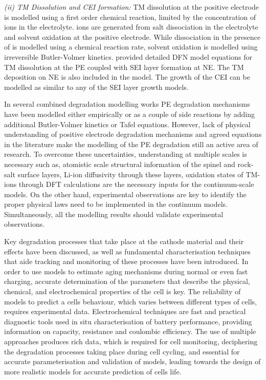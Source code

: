 \documentclass[journal=jacsat,manuscript=article]{achemso}
\begin{document}
\textit{(ii) TM Dissolution and CEI formation:} TM dissolution at the positive electrode is modelled using a first order chemical reaction, limited by the concentration of  ions in the electrolyte. \cite{dai2012capacity}  ions are generated from  salt dissociation in the electrolyte and solvent oxidation at the positive electrode. While  dissociation in the presence of  is modelled using a chemical reaction rate, solvent oxidation is modelled using irreversible Butler-Volmer kinetics. \cite{dai2012capacity} \citeauthor{lin2013comprehensive} provided detailed DFN model equations for TM dissolution at the PE coupled with SEI layer formation at NE. \cite{lin2013comprehensive} The TM deposition on NE is also included in the model. The growth of the CEI can be modelled as similar to any of the SEI layer growth models. 

In several combined degradation modelling works PE degradation mechanisms have been modelled either empirically or as a couple of side reactions by adding additional Butler-Volmer kinetics or Tafel equations. \cite{lin2013comprehensive,reniers2019review} However, lack of physical understanding of positive electrode degradation mechanisms and agreed equations in the literature make the modelling of the PE degradation still an active area of research. To overcome these uncertainties, understanding at multiple scales is necessary such as, atomistic scale structural information of the spinel and rock-salt surface layers, Li-ion diffusivity through these layers, oxidation states of TM-ions through DFT calculations are the necessary inputs for the continuum-scale models. On the other hand, experimental observations are key to identify the proper physical laws need to be implemented in the continuum models. Simultaneously, all the modelling results should validate experimental observations.

Key degradation processes that take place at the cathode material and their effects have been discussed, as well as fundamental characterisation techniques that aide tracking and monitoring of these processes have been introduced. In order to use models to estimate aging mechanisms during normal or even fast charging, accurate determination of the parameters that describe the physical, chemical, and electrochemical properties of the cell is key. The reliability of models to predict a cells behaviour, which varies between different types of cells, requires experimental data. Electrochemical techniques are fast and practical diagnostic tools used in situ characterisation of battery performance, providing information on capacity, resistance and coulombic efficiency. The use of multiple approaches produces rich data, which is required for cell monitoring, deciphering the degradation processes taking place during cell cycling, and essential for accurate parameterisation and validation of models, leading towards the design of more realistic models for accurate prediction of cells life.
\end{document}

